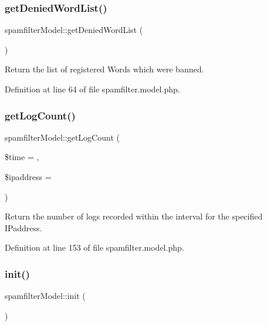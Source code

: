 \subsubsection{\texorpdfstring{get\+Denied\+Word\+List()}{getDeniedWordList()}}
{\footnotesize\ttfamily spamfilter\+Model\+::get\+Denied\+Word\+List (\begin{DoxyParamCaption}{ }\end{DoxyParamCaption})}



Return the list of registered Words which were banned. 



Definition at line 64 of file spamfilter.\+model.\+php.

\hypertarget{classspamfilterModel_a3f46333476c1f3e3feba759dca738288}{}\label{classspamfilterModel_a3f46333476c1f3e3feba759dca738288} 
\subsubsection{\texorpdfstring{get\+Log\+Count()}{getLogCount()}}
{\footnotesize\ttfamily spamfilter\+Model\+::get\+Log\+Count (\begin{DoxyParamCaption}\item[{}]{\$time = {},  }\item[{}]{\$ipaddress = {\ttfamily \textquotesingle{}\textquotesingle{}} }\end{DoxyParamCaption})}



Return the number of logs recorded within the interval for the specified I\+Paddress. 



Definition at line 153 of file spamfilter.\+model.\+php.

\hypertarget{classspamfilterModel_ab4bc83fb75d4c469e674e46ae0e22b52}{}\label{classspamfilterModel_ab4bc83fb75d4c469e674e46ae0e22b52} 
\subsubsection{\texorpdfstring{init()}{init()}}
{\footnotesize\ttfamily spamfilter\+Model\+::init (\begin{DoxyParamCaption}{ }\end{DoxyParamCaption})}



